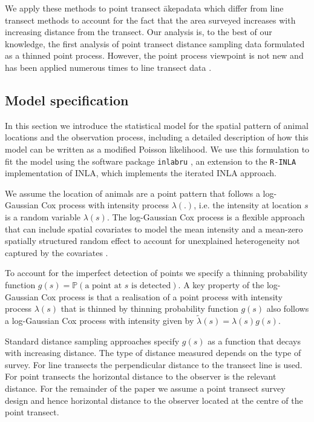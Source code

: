 \documentclass[preprint,12pt]{elsarticle}
\newcommand{\tl}{\tilde{\lambda}}   %
\newcommand{\akepa}{\textquotesingle\={a}kepa}  %
\begin{document}
We apply these methods to point transect \akepa data which differ from line transect methods to account for the fact that the area surveyed increases with increasing distance from the transect.  Our analysis is, to the best of our knowledge, the first analysis of point transect distance sampling data formulated as a thinned point process.  However, the point process viewpoint is not new and has been applied numerous times to line transect data \citep{buckland_model-based_2016, johnson_model-based_2010, hedley_spatial_2004,  hogmander_random_1991, stoyan_remark_1982, waagepetersen_likelihood-based_2006}.  

\subsection{Model specification}

In this section we introduce the statistical model for the spatial pattern of animal locations and the observation process, including a detailed description of how this model can be written as a modified Poisson likelihood.  We use this formulation to fit the model using the software package \texttt{inlabru} \citep{bachl_inlabru_2019}, an extension to the \texttt{R-INLA} implementation of INLA, which implements the iterated INLA approach.

We assume the location of animals are a point pattern that follows a log-Gaussian Cox process with intensity process $\lambda(.)$, i.e.  the intensity at location $s$ is a random variable $\lambda(s)$.  The log-Gaussian Cox process is a flexible approach that can include spatial covariates to model the mean intensity and a mean-zero spatially structured random effect to account for unexplained heterogeneity not captured by the covariates \citep{moller_log_1998}.

To account for the imperfect detection of points we specify a thinning probability function $g(s) = \mathbb{P}(\text{a point at $s$ is detected})$. A key property of the log-Gaussian Cox process is that a realisation of a point process with intensity process $\lambda(s)$ that is thinned by thinning probability function $g(s)$ also follows a log-Gaussian Cox process with intensity given by $\tl(s) = \lambda(s)g(s)$.

Standard distance sampling approaches specify $g(s)$ as a function that decays with increasing distance.  The type of distance measured depends on the type of survey.  For line transects the perpendicular distance to the transect line is used.  For point transects the horizontal distance to the observer is the relevant distance.  For the remainder of the paper we assume a point transect survey design and hence horizontal distance to the observer located at the centre of the point transect.  
\end{document}
